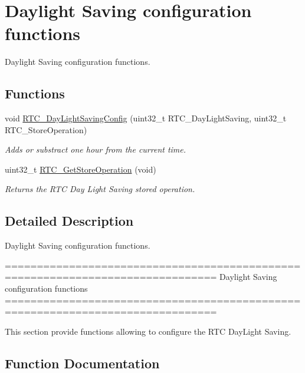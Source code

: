 \hypertarget{group___r_t_c___group5}{}\section{Daylight Saving configuration functions}
\label{group___r_t_c___group5}


Daylight Saving configuration functions.  


\subsection*{Functions}
\begin{DoxyCompactItemize}
\item 
void \hyperlink{group___r_t_c___group5_ga812feddea77990b5dc336a4989ae61b8}{R\+T\+C\+\_\+\+Day\+Light\+Saving\+Config} (uint32\+\_\+t R\+T\+C\+\_\+\+Day\+Light\+Saving, uint32\+\_\+t R\+T\+C\+\_\+\+Store\+Operation)
\begin{DoxyCompactList}\small\item\em Adds or substract one hour from the current time. \end{DoxyCompactList}\item 
uint32\+\_\+t \hyperlink{group___r_t_c___group5_gaba0c1361790203e9dca43846f0d9bc15}{R\+T\+C\+\_\+\+Get\+Store\+Operation} (void)
\begin{DoxyCompactList}\small\item\em Returns the R\+T\+C Day Light Saving stored operation. \end{DoxyCompactList}\end{DoxyCompactItemize}


\subsection{Detailed Description}
Daylight Saving configuration functions. 

\begin{DoxyVerb} ===============================================================================
                    Daylight Saving configuration functions
 ===============================================================================  

  This section provide functions allowing to configure the RTC DayLight Saving.\end{DoxyVerb}
 

\subsection{Function Documentation}
\hypertarget{group___r_t_c___group5_ga812feddea77990b5dc336a4989ae61b8}{}
